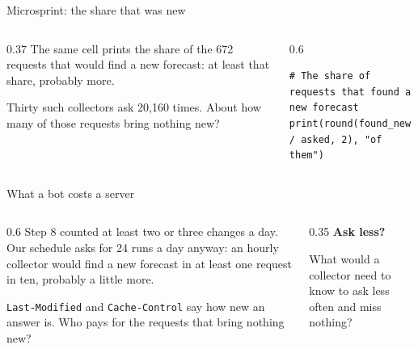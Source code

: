 \documentclass[9pt,aspectratio=169]{beamer}
\begin{document}
\begin{frame}[fragile]{Microsprint: the share that was new}
    \begin{columns}[T]
        \begin{column}{0.37\textwidth}
            The same cell prints the share of the 672 requests that would find a new forecast: at least that share, probably more.

            \medskip
            Thirty such collectors ask 20,160 times. About how many of those requests bring nothing new?
        \end{column}
        \begin{column}{0.6\textwidth}
\begin{lstlisting}
# The share of requests that found a new forecast
print(round(found_new / asked, 2), "of them")
\end{lstlisting}
        \end{column}
    \end{columns}
\end{frame}

\begin{frame}{What a bot costs a server}
    \begin{columns}[T]
        \begin{column}{0.6\textwidth}
            Step 8 counted at least two or three changes a day. Our schedule asks for 24 runs a day anyway: an hourly collector would find a new forecast in at least one request in ten, probably a little more.

            \medskip
            \texttt{Last-Modified} and \texttt{Cache-Control} say how new an answer is. Who pays for the requests that bring nothing new?
        \end{column}
        \begin{column}{0.35\textwidth}
            \textbf{Ask less?}\\[2pt]
            {\footnotesize What would a collector need to know to ask less often and miss nothing?\par}
        \end{column}
    \end{columns}
\end{frame}
\end{document}
